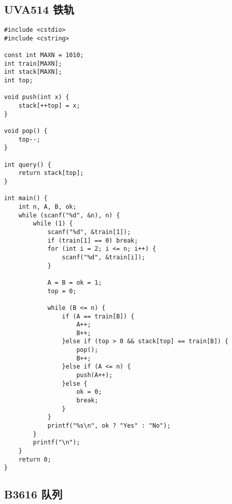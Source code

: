 \documentclass{ctexart}
\begin{document}
\subsection{UVA514 铁轨}

\begin{lstlisting}
#include <cstdio>
#include <cstring>

const int MAXN = 1010;
int train[MAXN];
int stack[MAXN];
int top;

void push(int x) {
    stack[++top] = x;
}

void pop() {
    top--;
}

int query() {
    return stack[top];
}

int main() {
    int n, A, B, ok;
    while (scanf("%d", &n), n) {
        while (1) {
            scanf("%d", &train[1]);
            if (train[1] == 0) break;
            for (int i = 2; i <= n; i++) {
                scanf("%d", &train[i]);
            }

            A = B = ok = 1;
            top = 0;  

            while (B <= n) {  
                if (A == train[B]) {
                    A++;
                    B++;
                }else if (top > 0 && stack[top] == train[B]) {
                    pop();
                    B++;
                }else if (A <= n) {
                    push(A++);
                }else {
                    ok = 0;
                    break;
                }
            }
            printf("%s\n", ok ? "Yes" : "No");
        }
        printf("\n");
    }
    return 0;
}

\end{lstlisting}

\subsection{B3616 队列}
\end{document}
